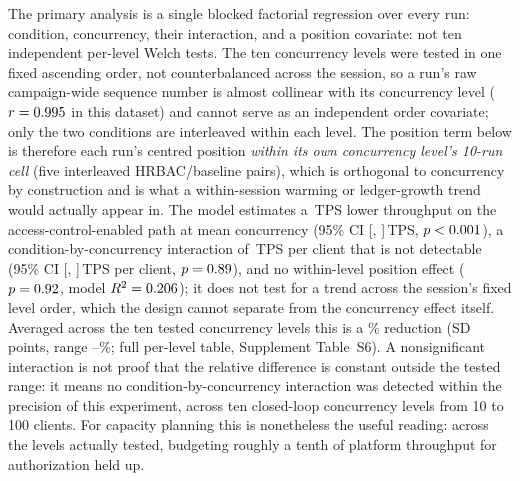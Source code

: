 \documentclass[a4paper,fleqn]{cas-dc}
\begin{document}
The primary analysis is a single blocked factorial regression over every
run: condition, concurrency, their interaction, and a position
covariate: not ten independent per-level Welch tests. The ten
concurrency levels were tested in one fixed ascending order, not
counterbalanced across the session, so a run's raw campaign-wide sequence
number is almost collinear with its concurrency level
($r=0.995$ in this dataset) and cannot serve as an
independent order covariate; only the two conditions are interleaved
within each level. The position term below is therefore each run's
centred position \emph{within its own concurrency level's 10-run cell}
(five interleaved HRBAC/baseline pairs), which is orthogonal to
concurrency by construction and is what a within-session warming or
ledger-growth trend would actually appear in. The model estimates a
\ThrCondCoef\,TPS lower throughput on the access-control-enabled path at
mean concurrency (95\% CI [\ThrCondCoefCILow, \ThrCondCoefCIHigh]\,TPS,
$p<0.001$), a condition-by-concurrency interaction of
\ThrInteractCoef\,TPS per client that is not detectable (95\% CI
[\ThrInteractCILow, \ThrInteractCIHigh]\,TPS per client,
$p=0.89$), and no within-level position effect
($p=0.92$, model $R^2=0.206$); it does not test for a
trend across the session's fixed level order, which the design cannot
separate from the concurrency effect itself. Averaged across the ten
tested concurrency
levels this is a \OverheadMeanPct\% reduction (SD \OverheadSDPct{} points,
range \OverheadMinPct--\OverheadMaxPct\%; full per-level table,
Supplement Table~S6). A nonsignificant interaction is not proof that the
relative difference is constant outside the tested range: it means no
condition-by-concurrency interaction was detected within the precision of
this experiment, across ten closed-loop concurrency levels from 10 to 100
clients. For capacity planning this is nonetheless the useful reading:
across the levels actually tested, budgeting roughly a tenth of platform
throughput for authorization held up.
\end{document}
